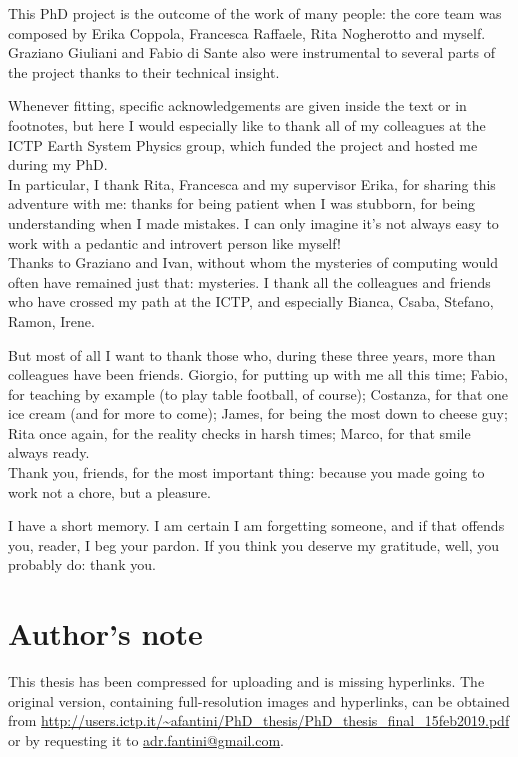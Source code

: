 \begin{acknowledgements}
\addchaptertocentry{\acknowledgementname} %
This PhD project is the outcome of the work of many people: the core team was composed by Erika Coppola, Francesca Raffaele, Rita Nogherotto and myself. Graziano Giuliani and Fabio di Sante also were instrumental to several parts of the project thanks to their technical insight. 

Whenever fitting, specific acknowledgements are given inside the text or in footnotes, but here I would especially like to thank all of my colleagues at the ICTP Earth System Physics group, which funded the project and hosted me during my PhD.\\
In particular, I thank Rita, Francesca and my supervisor Erika, for sharing this adventure with me: thanks for being patient when I was stubborn, for being understanding when I made mistakes.
I can only imagine it's not always easy to work with a pedantic and introvert person like myself!\\
Thanks to Graziano and Ivan, without whom the mysteries of computing would often have remained just that: mysteries.
I thank all the colleagues and friends who have crossed my path at the ICTP, and especially Bianca, Csaba, Stefano, Ramon, Irene.

But most of all I want to thank those who, during these three years, more than colleagues have been friends.
Giorgio, for putting up with me all this time; Fabio, for teaching by example (to play table football, of course); Costanza, for that one ice cream (and for more to come); James, for being the most down to cheese guy; Rita once again, for the reality checks in harsh times; Marco, for that smile always ready.\\
Thank you, friends, for the most important thing: because you made going to work not a chore, but a pleasure. 

I have a short memory. I am certain I am forgetting someone, and if that offends you, reader, I beg your pardon. If you think you deserve my gratitude, well, you probably do: thank you.

\newpage
\section*{Author's note}
This thesis has been compressed for uploading and is missing hyperlinks.
The original version, containing full-resolution images and hyperlinks, can be obtained from \url{http://users.ictp.it/~afantini/PhD_thesis/PhD_thesis_final_15feb2019.pdf} or by requesting it to \href{mailto:adr.fantini@gmail.com}{adr.fantini@gmail.com}.


\end{acknowledgements}
